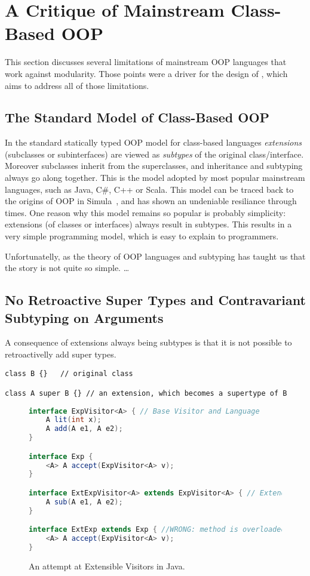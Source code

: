 \section{A Critique of Mainstream Class-Based OOP}
\label{sec:critique}

This section discusses several limitations of mainstream OOP languages
that work against modularity. Those points were a driver for the
design of \name, which aims to address all of those limitations. 

\subsection{The Standard Model of Class-Based OOP}

In the standard statically typed OOP model for class-based languages
\emph{extensions} (subclasses or subinterfaces) are viewed as \emph{subtypes} of the original
class/interface. Moreover subclasses inherit from the superclasses,
and inheritance and subtyping always go along together.
This is the model adopted by most popular mainstream
languages, such as Java, C\#, C++ or Scala. This model can be traced
back to the origins of OOP in Simula~\cite{}, and has shown an 
undeniable resiliance through times. One reason why this model remains 
so popular is probably simplicity: 
extensions (of classes or interfaces) always result in subtypes.  
This results in a very simple programming model, which is easy 
to explain to programmers.  

Unfortunatelly, as the theory of OOP languages and subtyping has taught 
us that the story is not quite so simple.  \ldots

\subsection{No Retroactive Super Types and Contravariant Subtyping on Arguments}

A consequence of extensions always being subtypes is that it is not
possible to retroactivelly add super types. 

\begin{lstlisting}
class B {}   // original class

class A super B {} // an extension, which becomes a supertype of B
\end{lstlisting}

\begin{figure}
\begin{lstlisting}[language=java]
interface ExpVisitor<A> { // Base Visitor and Language
	A lit(int x);
	A add(A e1, A e2);
}

interface Exp {
	<A> A accept(ExpVisitor<A> v);
}

interface ExtExpVisitor<A> extends ExpVisitor<A> { // Extended Visitor and Language
	A sub(A e1, A e2);
}

interface ExtExp extends Exp { //WRONG: method is overloaded, not overriden!
	<A> A accept(ExpVisitor<A> v); 
}
\end{lstlisting}
\caption{An attempt at Extensible Visitors in Java.}
\label{fig:JVis}
\end{figure}


